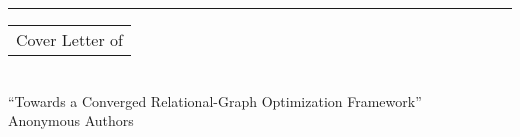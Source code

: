 \documentclass{article}
\begin{document}


\vspace{-1em} %

\rule{\linewidth}{1pt} %

\begin{center}
	\begin{tabular}{c}
		\huge
		Cover Letter of
	\end{tabular}
	\\
	\vspace{.15in}
	\Large
	``Towards a Converged Relational-Graph Optimization Framework''
	\large
	\\
	\vspace{.1in}
	Anonymous Authors
\end{center}





\bigskip %
\end{document}
